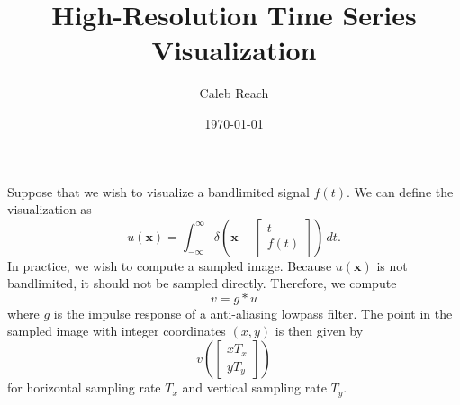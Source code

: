 \documentclass{article}
\title{High-Resolution Time Series Visualization}
\author{Caleb Reach}
\date{\today}
\let\V\boldsymbol
\begin{document}
\maketitle
Suppose that we wish to visualize a bandlimited signal $f(t)$.  We can define the visualization as
\[
u(\V x) = \int_{-\infty}^{\infty} \delta\left(\V x - \begin{bmatrix}t\\f(t)\end{bmatrix}\right)\,dt.
\]
In practice, we wish to compute a sampled image.  Because $u(\V x)$ is not bandlimited, it should not be sampled directly.  Therefore, we compute
\[
v = g*u
\]
where $g$ is the impulse response of a anti-aliasing lowpass filter.  The point in the sampled image with integer coordinates $(x,y)$ is then given by
\[
v\left(\begin{bmatrix}xT_x\\yT_y\end{bmatrix}\right)
\]
for horizontal sampling rate $T_x$ and vertical sampling rate $T_y$.
\end{document}
